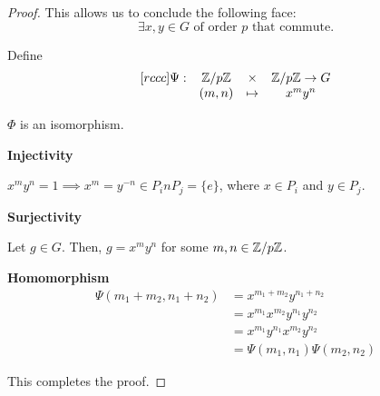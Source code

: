 \begin{proof}
    This allows us to conclude the following face: \[
        \exists x, y \in G \text{ of order } p \text{ that commute}.
    \]

    Define \[
        \begin{matrix}[rccc]
            \Psi: & \mathbb{Z}/p\mathbb{Z} & \times  & \mathbb{Z}/p\mathbb{Z} \to G \\
                  & (m, n) & \mapsto & x^m y^n
        \end{matrix}
    \]

    \begin{claim}
        $\Phi$ is an isomorphism.
    \end{claim}

    \begin{listu}
        \item \textbf{Injectivity}
        
        $x^m y^n = 1 \implies x^m = y^{-n} \in P_i n P_j = \{ e \}$, where $x \in P_i$ and $y \in P_j$.

        \item \textbf{Surjectivity}
        
        Let $g \in G$. Then, $g = x^m y^n$ for some $m, n \in \mathbb{Z}/p\mathbb{Z}$.

        \item \textbf{Homomorphism}
        \vspace{-1em}
        \begin{align*}
            \Psi(m_1 + m_2, n_1 + n_2) & = x^{m_1 + m_2} y^{n_1 + n_2}     \\
                                       & = x^{m_1} x^{m_2} y^{n_1} y^{n_2} \\
                                       & = x^{m_1} y^{n_1} x^{m_2} y^{n_2} \\
                                       & = \Psi(m_1, n_1) \Psi(m_2, n_2)
        \end{align*}
    \end{listu}

    This completes the proof.
\end{proof}